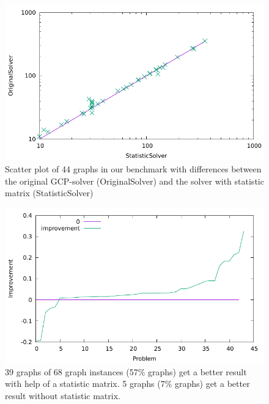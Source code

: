 \documentclass[12pt,a4paper,twoside]{scrartcl}
\numberwithin{equation}{section}
\begin{document}
\begin{figure}[h!]
\centering
  \includegraphics[scale = 1]{Experiments/E4/scalog.pdf}
  \caption{Scatter plot of 44 graphs in our benchmark with differences between the original GCP-solver (OriginalSolver) and the solver with statistic matrix (StatisticSolver)}
  \end{figure}
\begin{figure}[h!]
\centering
  \includegraphics[scale = 1]{Experiments/E4/impro.pdf}
      \caption{39 graphs of 68 graph instances (57\% graphs) get a better result with help of a statistic matrix. 5 graphs (7\% graphs) get a better result without statistic matrix.}
\end{figure} 
\end{document}
